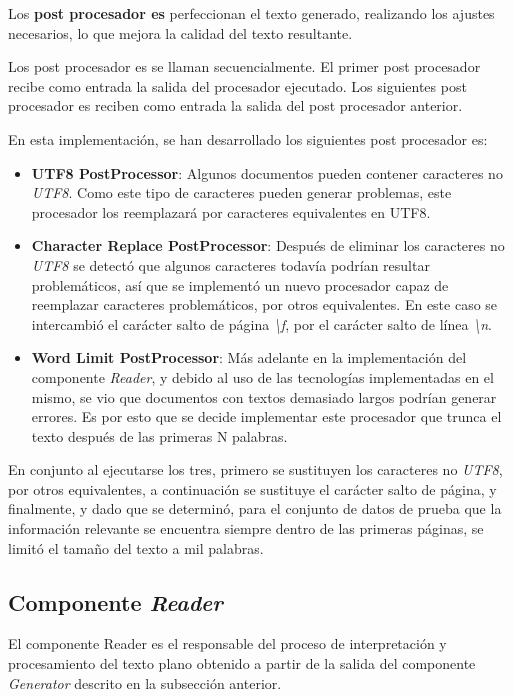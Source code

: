 Los \textbf{post procesador es} perfeccionan el texto generado, realizando los ajustes necesarios, lo que mejora la
calidad del texto resultante.

Los post procesador es se llaman secuencialmente.
El primer post procesador recibe como entrada la salida del procesador ejecutado.
Los siguientes post procesador es reciben como entrada la salida del post procesador anterior.

En esta implementación, se han desarrollado los siguientes post procesador es:

\begin{itemize}
    \item
    \textbf{UTF8 PostProcessor}: Algunos documentos pueden contener caracteres no \textit{UTF8}.
    Como este tipo de caracteres pueden generar problemas, este procesador los reemplazará por caracteres equivalentes
    en UTF8.
    \item
    \textbf{Character Replace PostProcessor}: Después de eliminar los caracteres no \textit{UTF8} se detectó que algunos
    caracteres todavía podrían resultar problemáticos, así que se implementó un nuevo procesador capaz de reemplazar
    caracteres problemáticos, por otros equivalentes.
    En este caso se intercambió el carácter salto de página \textit{\textbackslash f}, por el carácter
    salto de línea \textit{\textbackslash n}.
    \item
    \textbf{Word Limit PostProcessor}: Más adelante en la implementación del componente \textit{Reader}, y debido al uso
    de las tecnologías implementadas en el mismo, se vio que documentos con textos demasiado largos podrían generar
    errores.
    Es por esto que se decide implementar este procesador que trunca el texto después de las primeras N palabras.
\end{itemize}

En conjunto al ejecutarse los tres, primero se sustituyen los caracteres no \textit{UTF8}, por otros equivalentes, a
continuación se sustituye el carácter salto de página, y finalmente, y dado que se determinó, para el conjunto de
datos de prueba que la información relevante se encuentra siempre dentro de las primeras páginas, se limitó el
tamaño del texto a mil palabras.

\subsection*{Componente \textit{Reader}}\label{subsec:chapter_4.reader_component}
El componente Reader es el responsable del proceso de interpretación y procesamiento del texto plano obtenido a
partir de la salida del componente \textit{Generator} descrito en la subsección anterior.

